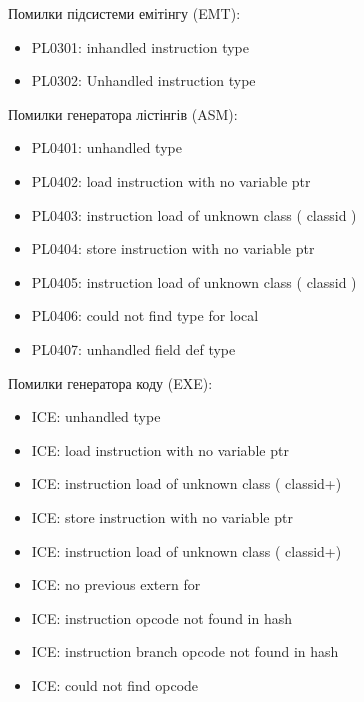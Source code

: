 \documentclass{memoir}
\begin{document}
Помилки підсистеми емітінгу (EMT):

\begin{itemize}
\item PL0301: inhandled instruction type
\item PL0302: Unhandled instruction type
\end{itemize}

Помилки генератора лістінгів (ASM):

\begin{itemize}
\item PL0401: unhandled type
\item PL0402: load instruction with no variable ptr
\item PL0403: instruction load of unknown class ( classid )
\item PL0404: store instruction with no variable ptr
\item PL0405: instruction load of unknown class ( classid )
\item PL0406: could not find type for local
\item PL0407: unhandled field def type
\end{itemize}

Помилки генератора коду (EXE):

\begin{itemize}
\item ICE: unhandled type
\item ICE: load instruction with no variable ptr
\item ICE: instruction load of unknown class ( classid+)
\item ICE: store instruction with no variable ptr
\item ICE: instruction load of unknown class ( classid+)
\item ICE: no previous extern for
\item ICE: instruction opcode not found in hash
\item ICE: instruction branch opcode not found in hash
\item ICE: could not find opcode
\end{itemize}
\end{document}

